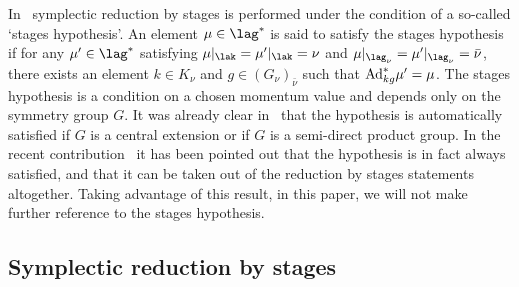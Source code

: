 In~\cite{MarsdenHamRed} symplectic reduction by stages is performed under the condition of a so-called `stages hypothesis'. An element $\mu\in\lag^*$ is said to satisfy the stages hypothesis if for any $\mu'\in\lag^*$ satisfying $\mu|_\lak=\mu'|_\lak=\nu$ and $\mu|_{\lag_\nu} = \mu'|_{\lag_\nu} =\bar\nu$, there exists an element $k\in K_\nu$ and $g\in (G_\nu)_{\bar\nu}$ such that ${\rm Ad}^*_{kg} \mu'= \mu$.
The stages hypothesis is a condition on a chosen momentum value and depends only on the symmetry group $G$. It was already clear in~\cite{MarsdenHamRed} that the hypothesis is automatically satisf\/ied if $G$ is a central extension or if $G$ is a semi-direct product group. In the recent contribution~\cite{mikityuk} it has been pointed out that the hypothesis is in fact always satisf\/ied, and that it can be taken out of the reduction by stages statements altogether. Taking advantage of this result, in this paper, we will not make further reference to the stages hypothesis.


\subsection{Symplectic reduction by stages}\label{section6.1}

